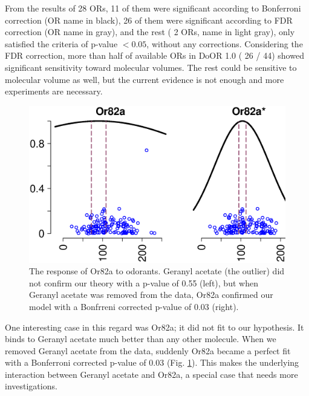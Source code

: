 \documentclass[fleqn,10pt]{wlscirep} %
\newcommand{\numberofreceptors}{ 28 }
\newcommand{\bonferroni}{ 11 }
\newcommand{\fdr}{ 26 }
\newcommand{\nocorrection}{ 2 }
\begin{document}
From the results of \numberofreceptors ORs, 
\bonferroni of them were significant according to Bonferroni correction (OR name in black), 
\fdr of them were significant according to FDR correction (OR name in gray), 
and the rest (\nocorrection ORs, name in light gray), 
only satisfied the criteria of p-value $<0.05$, without any corrections.
Considering the FDR correction, 
more than half of available ORs in DoOR 1.0 (\fdr / 44) showed significant sensitivity toward molecular volumes. 
The rest could be sensitive to molecular volume as well, 
but the current evidence is not enough and more experiments are necessary. 

\begin{figure}
	\centering
	\includegraphics[width= 0.75 \textwidth]{vol-res-Or82a.eps}
	\caption{The response of Or82a to odorants.  Geranyl acetate (the outlier) did not confirm our theory with a p-value of 0.55 (left), 
	but when Geranyl acetate was removed from the data, 
	Or82a confirmed our model with a Bonfrreni corrected p-value of 0.03 (right).}
	\label{fig:Or82a}
\end{figure}
One interesting case in this regard was Or82a; it did not fit to our hypothesis. 
It binds to Geranyl acetate much better than any other molecule. 
When we removed Geranyl acetate from the data, suddenly Or82a became a perfect fit with a Bonferroni corrected p-value of 0.03 (Fig. \ref{fig:Or82a}). 
This makes the underlying interaction between Geranyl acetate and Or82a, a special case that needs more investigations.
\end{document}
